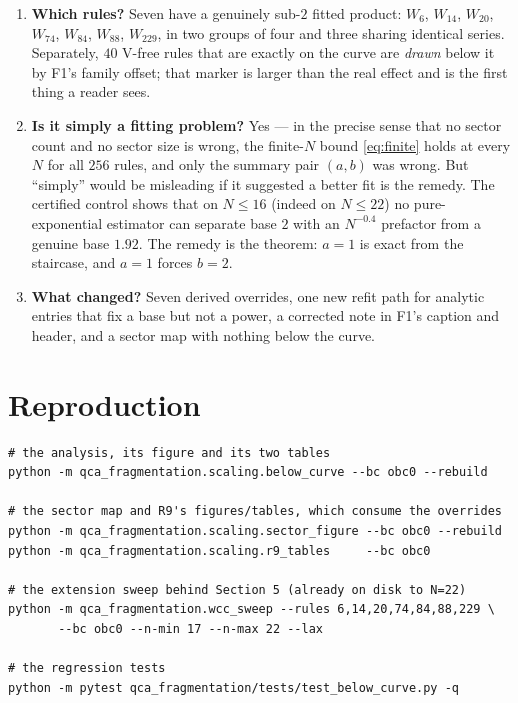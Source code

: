 \documentclass[11pt]{article}
\theoremstyle{plain}
\begin{document}
\begin{enumerate}
\item \textbf{Which rules?} Seven have a genuinely sub-$2$ fitted product:
$W_6$, $W_{14}$, $W_{20}$, $W_{74}$, $W_{84}$, $W_{88}$, $W_{229}$, in two groups
of four and three sharing identical series. Separately, $40$ V-free rules that
are exactly on the curve are \emph{drawn} below it by F1's family offset; that
marker is larger than the real effect and is the first thing a reader sees.

\item \textbf{Is it simply a fitting problem?} Yes --- in the precise sense that
no sector count and no sector size is wrong, the finite-$N$ bound
\eqref{eq:finite} holds at every $N$ for all $256$ rules, and only the summary
pair $(a,b)$ was wrong. But ``simply'' would be misleading if it suggested a
better fit is the remedy. The certified control shows that on $N\le16$ (indeed on
$N\le22$) no pure-exponential estimator can separate base $2$ with an $N^{-0.4}$
prefactor from a genuine base $1.92$. The remedy is the theorem: $a=1$ is exact
from the staircase, and $a=1$ forces $b=2$.

\item \textbf{What changed?} Seven derived overrides, one new refit path for
analytic entries that fix a base but not a power, a corrected note in F1's
caption and header, and a sector map with nothing below the curve.
\end{enumerate}

\section{Reproduction}

\begin{verbatim}
# the analysis, its figure and its two tables
python -m qca_fragmentation.scaling.below_curve --bc obc0 --rebuild

# the sector map and R9's figures/tables, which consume the overrides
python -m qca_fragmentation.scaling.sector_figure --bc obc0 --rebuild
python -m qca_fragmentation.scaling.r9_tables     --bc obc0

# the extension sweep behind Section 5 (already on disk to N=22)
python -m qca_fragmentation.wcc_sweep --rules 6,14,20,74,84,88,229 \
       --bc obc0 --n-min 17 --n-max 22 --lax

# the regression tests
python -m pytest qca_fragmentation/tests/test_below_curve.py -q
\end{verbatim}
\end{document}
